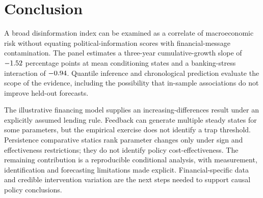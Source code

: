 \section{Conclusion}\label{sec:conclusion}

A broad disinformation index can be examined as a correlate of macroeconomic
risk without equating political-information scores with financial-message
contamination. The panel estimates a three-year cumulative-growth
slope of $-1.52$ percentage points at mean conditioning states and a
banking-stress interaction of $-0.94$. Quantile inference and
chronological prediction evaluate the scope of the evidence, including the
possibility that in-sample associations do not improve held-out forecasts.

The illustrative financing model supplies an increasing-differences result
under an explicitly assumed lending rule. Feedback can generate multiple
steady states for some parameters, but the empirical exercise does not
identify a trap threshold. Persistence comparative statics rank parameter
changes only under sign and effectiveness restrictions; they do not identify
policy cost-effectiveness. The remaining contribution is a reproducible
conditional analysis, with measurement, identification and forecasting
limitations made explicit. Financial-specific data and credible intervention
variation are the next steps needed to support causal policy conclusions.
